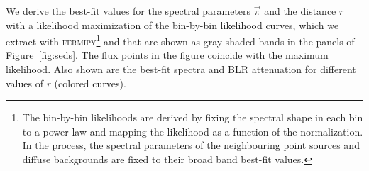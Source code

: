 \documentclass[twocolumn,linenumbers]{aastex62}
\begin{document}
We derive the best-fit values for the spectral parameters $\vec{\pi}$ and the distance $r$ with a likelihood maximization of the bin-by-bin likelihood curves, which we extract with \textsc{fermipy}\footnote{The bin-by-bin likelihoods are derived by fixing the spectral shape in each bin to a power law and mapping the likelihood as a function of the normalization. In the process, the spectral parameters of the neighbouring point sources and diffuse backgrounds are fixed to their broad band best-fit values.} and that are shown as gray shaded bands in the panels of Figure~\ref{fig:seds}. 
The flux points in the figure coincide with the maximum likelihood. 
Also shown are the best-fit spectra and BLR attenuation for different values of $r$ (colored curves). 
\end{document}
